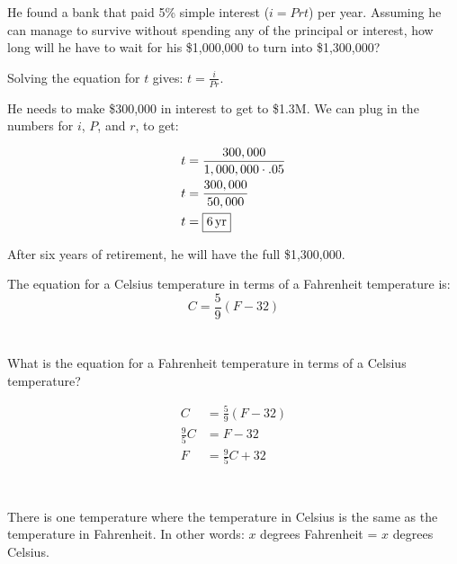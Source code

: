 \documentclass[letterpaper]{exam}
\begin{document}
\begin{questions}
\begin{parts}
          He found a bank that paid 5\% simple interest ($i = Prt$) per year. Assuming he can manage to survive without
          spending any of the principal or interest, how long will he have to wait for his \$1,000,000 to turn into
          \$1,300,000?

          \begin{solution}
            Solving the equation for $t$ gives: $t = \frac{i}{P r}$.  
            
            He needs to make \$300,000 in interest to get to
            \$1.3M.  We can plug in the numbers for $i$, $P$, and $r$, to get:

              \begin{align*}
                t & = \frac{300,000}{1,000,000 \cdot .05}   \\
                t & = \frac{300,000}{50,000}   \\
                t & = \boxed{ \unit[6]{yr} } \\
              \end{align*}

              After six years of retirement, he will have the full \$1,300,000.

          \end{solution}

      \end{parts}

    \question{}
      The equation for a Celsius temperature in terms of a Fahrenheit temperature is:
      \[
        C = \frac{5}{9} ( F - 32 ) 
      \]

      \begin{parts}
        \part{} What is the equation for a Fahrenheit temperature in terms of a Celsius temperature?
          \begin{solution}
            \begin{align*}
              C             & = \frac{5}{9} (F - 32) \\
              \frac{9}{5} C & = F - 32 \\
              F             & = \frac{9}{5} C + 32 \\
            \end{align*}
          \end{solution}

        \part{}
          There is one temperature where the temperature in Celsius is the same as the temperature in Fahrenheit.  In
          other words: $x$ degrees Fahrenheit = $x$ degrees Celsius.


\end{parts}
\end{questions}
\end{document}
